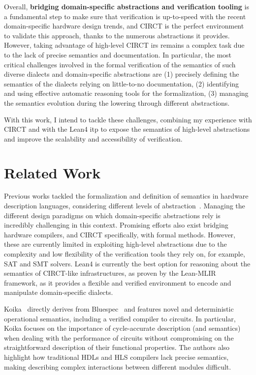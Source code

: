 \documentclass[sigconf,authorversion,nonacm, 11pt]{acmart}
\begin{document}
Overall, \textbf{bridging domain-specific abstractions and verification tooling} is a fundamental step to make sure that verification is up-to-speed with the recent domain-specific hardware design trends, and CIRCT is the perfect environment to validate this approach, thanks to the numerous abstractions it provides. 
However, taking advantage of high-level CIRCT \acp{ir} remains a complex task due to the lack of precise semantics and documentation. 
In particular, the most critical challenges involved in the formal verification of the semantics of such diverse dialects and domain-specific abstractions are 
(1) precisely defining the semantics of the dialects relying on little-to-no documentation, 
(2) identifying and using effective automatic reasoning tools for the formalization, 
(3) managing the semantics evolution during the lowering through different abstractions. 

With this work, I intend to tackle these challenges, combining my experience with CIRCT and with the Lean4 \ac{itp} to expose the semantics of high-level abstractions and improve the scalability and accessibility of verification. 

\section{Related Work}

Previous works tackled the formalization and definition of semantics in hardware description languages, considering different levels of abstraction~\cite{melham1988abstraction}. 
Managing the different design paradigms on which domain-specific abstractions rely is incredibly challenging in this context. 
Promising efforts also exist bridging hardware compilers, and CIRCT specifically, with formal methods. 
However, these are currently limited in exploiting high-level abstractions due to the complexity and low flexibility of the verification tools they rely on, for example, SAT and SMT solvers.
Lean4 is currently the best option for reasoning about the semantics of CIRCT-like infrastructures, as proven by the Lean-MLIR~\cite{bhat2024verifying} framework, as it provides a flexible and verified environment to encode and manipulate domain-specific dialects.

Koika~\cite{bourgeat2020essence} directly derives from Bluespec~\cite{bluespec} and features novel and deterministic operational semantics, including a verified compiler to circuits. 
In particular, Koika focuses on the importance of cycle-accurate description (and semantics) when dealing with the performance of circuits without compromising on the straightforward description of their functional properties. 
The authors also highlight how traditional HDLs and HLS compilers lack precise semantics, making describing complex interactions between different modules difficult.
\end{document}
